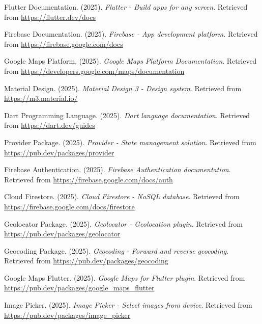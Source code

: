 \documentclass[12pt,a4paper]{article}
\begin{document}
\begin{enumerate}[label={[\arabic*]}]
    \item Flutter Documentation. (2025). \textit{Flutter - Build apps for any screen}. Retrieved from \url{https://flutter.dev/docs}
    
    \item Firebase Documentation. (2025). \textit{Firebase - App development platform}. Retrieved from \url{https://firebase.google.com/docs}
    
    \item Google Maps Platform. (2025). \textit{Google Maps Platform Documentation}. Retrieved from \url{https://developers.google.com/maps/documentation}
    
    \item Material Design. (2025). \textit{Material Design 3 - Design system}. Retrieved from \url{https://m3.material.io/}
    
    \item Dart Programming Language. (2025). \textit{Dart language documentation}. Retrieved from \url{https://dart.dev/guides}
    
    \item Provider Package. (2025). \textit{Provider - State management solution}. Retrieved from \url{https://pub.dev/packages/provider}
    
    \item Firebase Authentication. (2025). \textit{Firebase Authentication documentation}. Retrieved from \url{https://firebase.google.com/docs/auth}
    
    \item Cloud Firestore. (2025). \textit{Cloud Firestore - NoSQL database}. Retrieved from \url{https://firebase.google.com/docs/firestore}
    
    \item Geolocator Package. (2025). \textit{Geolocator - Geolocation plugin}. Retrieved from \url{https://pub.dev/packages/geolocator}
    
    \item Geocoding Package. (2025). \textit{Geocoding - Forward and reverse geocoding}. Retrieved from \url{https://pub.dev/packages/geocoding}
    
    \item Google Maps Flutter. (2025). \textit{Google Maps for Flutter plugin}. Retrieved from \url{https://pub.dev/packages/google_maps_flutter}
    
    \item Image Picker. (2025). \textit{Image Picker - Select images from device}. Retrieved from \url{https://pub.dev/packages/image_picker}
    

\end{enumerate}
\end{document}
